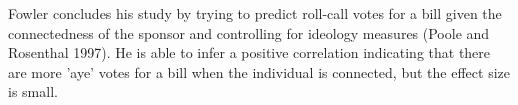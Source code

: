 Fowler concludes his study by trying to predict roll-call votes for a bill 
given the connectedness of the sponsor and controlling for ideology measures 
(Poole and Rosenthal 1997). He is able to infer a positive correlation 
indicating that there are more 'aye' votes for a bill when the individual is 
connected, but the effect size is small.

